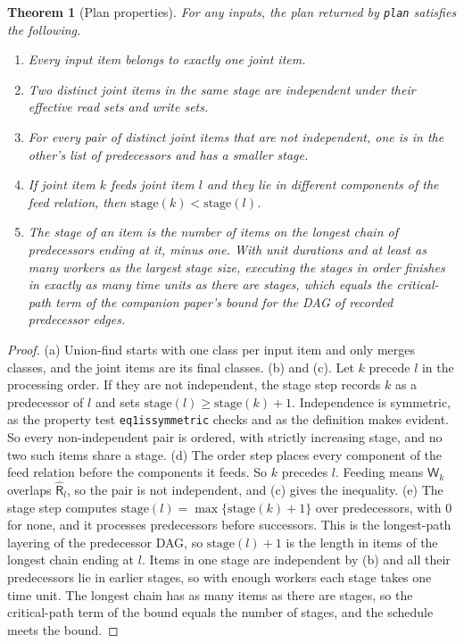 \documentclass[11pt,letterpaper]{article}
\newtheorem{theorem}{Theorem}[section]
\theoremstyle{definition}
\theoremstyle{remark}
\newcommand{\R}{\mathsf{R}}
\newcommand{\W}{\mathsf{W}}
\DeclareRobustCommand{\code}[1]{{\def\_{\textunderscore\allowbreak}\texttt{#1}}}
\begin{document}
\begin{theorem}[Plan properties]
\label{thm:pdd:plan}
For any inputs, the plan returned by \code{plan} satisfies the following.
\begin{enumerate}
\item[(a)] Every input item belongs to exactly one joint item.
\item[(b)] Two distinct joint items in the same stage are independent under their effective read sets and write sets.
\item[(c)] For every pair of distinct joint items that are not independent, one is in the other's list of predecessors and has a smaller stage.
\item[(d)] If joint item $k$ feeds joint item $l$ and they lie in different components of the feed relation, then $\mathrm{stage}(k)<\mathrm{stage}(l)$.
\item[(e)] The stage of an item is the number of items on the longest chain of predecessors ending at it, minus one. With unit durations and at least as many workers as the largest stage size, executing the stages in order finishes in exactly as many time units as there are stages, which equals the critical-path term of the companion paper's \cite[Eq.~2]{long2026inversion} bound for the DAG of recorded predecessor edges.
\end{enumerate}
\end{theorem}

\begin{proof}
(a) Union-find starts with one class per input item and only merges classes, and the joint items are its final classes.
(b) and (c). Let $k$ precede $l$ in the processing order. If they are not independent, the stage step records $k$ as a predecessor of $l$ and sets $\mathrm{stage}(l)\ge\mathrm{stage}(k)+1$. Independence is symmetric, as the property test \code{eq1\_is\_symmetric} checks and as the definition makes evident. So every non-independent pair is ordered, with strictly increasing stage, and no two such items share a stage.
(d) The order step places every component of the feed relation before the components it feeds. So $k$ precedes $l$. Feeding means $\W_k$ overlaps $\hat{\R}_l$, so the pair is not independent, and (c) gives the inequality.
(e) The stage step computes $\mathrm{stage}(l)=\max\{\mathrm{stage}(k)+1\}$ over predecessors, with 0 for none, and it processes predecessors before successors. This is the longest-path layering of the predecessor DAG, so $\mathrm{stage}(l)+1$ is the length in items of the longest chain ending at $l$. Items in one stage are independent by (b) and all their predecessors lie in earlier stages, so with enough workers each stage takes one time unit. The longest chain has as many items as there are stages, so the critical-path term of the bound equals the number of stages, and the schedule meets the bound.
\end{proof}
\end{document}
